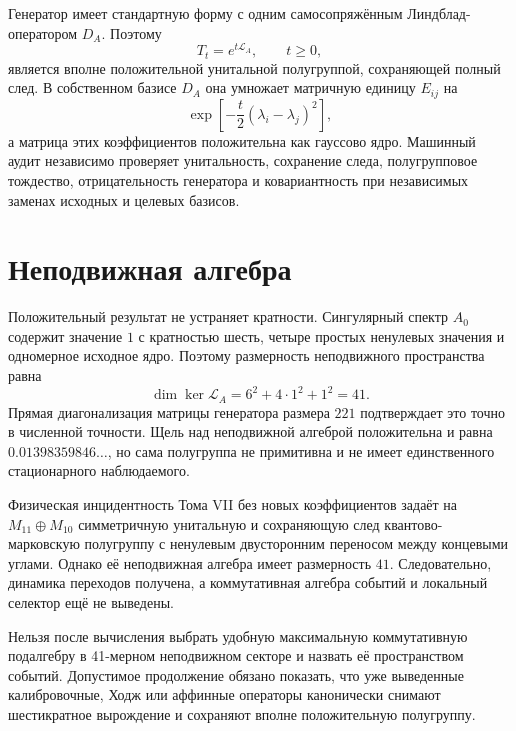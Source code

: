 Генератор имеет стандартную форму с одним самосопряжённым Линдблад-
оператором $D_A$. Поэтому
\begin{equation}
 T_t=e^{t\mathcal L_A},\qquad t\ge0,
 \end{equation}
является вполне положительной унитальной полугруппой, сохраняющей полный
след. В собственном базисе $D_A$ она умножает матричную единицу $E_{ij}$ на
\begin{equation}
 \exp\left[-\frac t2(\lambda_i-\lambda_j)^2\right],
 \label{eq:v8-linking-gaussian-schur-kernel}
\end{equation}
а матрица этих коэффициентов положительна как гауссово ядро. Машинный
аудит независимо проверяет унитальность, сохранение следа, полугрупповое
тождество, отрицательность генератора и ковариантность при независимых
заменах исходных  и целевых базисов.

\section{Неподвижная алгебра}

Положительный результат не устраняет кратности. Сингулярный спектр $A_0$
содержит значение $1$ с кратностью шесть, четыре простых ненулевых значения
и одномерное исходное ядро. Поэтому размерность неподвижного пространства
равна
\begin{equation}
 \dim\ker\mathcal L_A
 =6^2+4\cdot1^2+1^2=41.
 \label{eq:v8-linking-fixed-algebra-dimension}
\end{equation}
Прямая диагонализация матрицы генератора размера $221$ подтверждает это
точно в численной точности. Щель над неподвижной алгеброй положительна и
равна $0.01398359846\ldots$, но сама полугруппа не примитивна и не имеет
единственного стационарного наблюдаемого.

\begin{theorem}
Физическая инцидентность Тома VII без новых коэффициентов задаёт на
$M_{11}\oplus M_{10}$ симметричную унитальную и сохраняющую след
квантово-марковскую полугруппу с ненулевым двусторонним переносом между
концевыми углами. Однако её неподвижная алгебра имеет размерность $41$.
Следовательно, динамика переходов получена, а коммутативная алгебра событий
и локальный селектор ещё не выведены.
\end{theorem}

\begin{nogocriterion}
Нельзя после вычисления выбрать удобную максимальную коммутативную
подалгебру в 41-мерном неподвижном секторе и назвать её пространством
событий. Допустимое продолжение обязано показать, что уже выведенные калибровочные,
Ходж или аффинные операторы канонически снимают шестикратное вырождение и
сохраняют вполне положительную полугруппу.
\end{nogocriterion}

